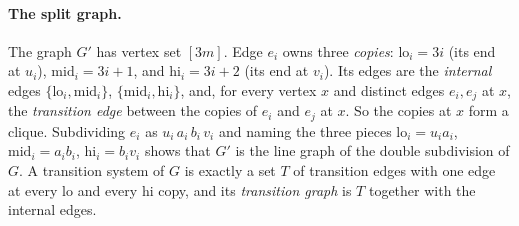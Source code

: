 \documentclass[10pt]{amsart}
\theoremstyle{plain}
\theoremstyle{definition}
\theoremstyle{remark}
\numberwithin{equation}{section}
\begin{document}
\paragraph{The split graph.} The graph $G'$ has vertex set $[3m]$. Edge $e_i$ owns three
\emph{copies}: $\mathrm{lo}_i=3i$ (its end at $u_i$), $\mathrm{mid}_i=3i+1$, and $\mathrm{hi}_i=3i+2$
(its end at $v_i$). Its edges are the \emph{internal} edges $\{\mathrm{lo}_i,\mathrm{mid}_i\}$,
$\{\mathrm{mid}_i,\mathrm{hi}_i\}$, and, for every vertex $x$ and distinct edges $e_i,e_j$ at $x$, the
\emph{transition edge} between the copies of $e_i$ and $e_j$ at $x$. So the copies at $x$ form a
clique. Subdividing $e_i$ as $u_i\,a_i\,b_i\,v_i$ and naming the three pieces
$\mathrm{lo}_i=u_ia_i$, $\mathrm{mid}_i=a_ib_i$, $\mathrm{hi}_i=b_iv_i$ shows that $G'$ is the line
graph of the double subdivision of $G$. A transition system of $G$ is exactly a set $T$ of transition
edges with one edge at every $\mathrm{lo}$ and every $\mathrm{hi}$ copy, and its \emph{transition
graph} is $T$ together with the internal edges.
\end{document}
